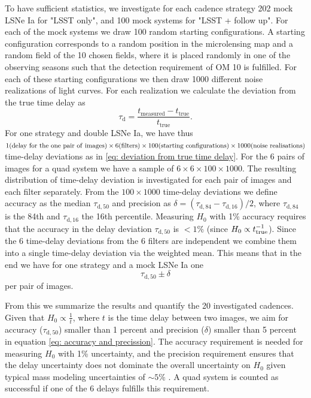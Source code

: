 To have sufficient statistics, we investigate for each cadence
strategy 202 mock LSNe Ia for "LSST only", and 100 mock systems for "LSST + follow up". For each of the mock systems we draw 100 random starting
configurations. A starting configuration corresponds to a random
position in the microlensing map and a random field of the 10 chosen fields, where it is placed randomly in one of the
observing seasons such that the detection requirement of OM 10 is
fulfilled. For each of these starting configurations we then draw 1000
different noise realizations of light curves. For each realization we calculate the deviation from the true time delay as
%
\begin{equation}
\tau_\mathrm{d} = \frac{t_\mathrm{measured} - t_\mathrm{true}}{t_\mathrm{true}}.
\label{eq: deviation from true time delay}
\end{equation}
For one strategy and double LSNe Ia, we have thus $1 {\rm (delay\ for\ the\
one\ pair\ of\ images)} \times 6 {\rm (filters)} \times 100 {\rm
(starting\ configurations)} \times 1000 {\rm (noise\ realisations)}$
time-delay deviations as in \eqref{eq: deviation from true time delay}.
For the 6 pairs of images for a quad system we have a sample of $6
\times 6 \times 100 \times 1000$. The resulting distribution of
time-delay deviation is investigated for each pair of images and each
filter separately. From the $100 \times 1000$ time-delay deviations we
define accuracy as the median $\tau_\mathrm{d,50}$ and precision as
$\delta = (\tau_\mathrm{d,84}-\tau_\mathrm{d,16})/2$, where
$\tau_\mathrm{d,84}$ is the 84th and $\tau_\mathrm{d,16}$ the 16th
percentile. Measuring $H_0$ with 1\% accuracy requires that the accuracy
in the delay deviation $\tau_\mathrm{d,50}$ is $<1\%$ (since $H_0 \propto
t_{\rm true}^{-1}$). Since the 6 time-delay deviations from the 6 filters are independent we combine them into a single time-delay deviation via the weighted mean. This means that in the end we have for one strategy and a mock LSNe Ia one 
\begin{equation}
\tau_\mathrm{d,50} \pm \delta
\label{eq: accuracy and precission}
\end{equation}
per pair of images.

From this we summarize the results and quantify the 20 investigated cadences. Given that $H_0 \propto \frac{1}{t}$, where $t$
is the time delay between two images, we aim for accuracy
($\tau_\mathrm{d,50}$) smaller than 1 percent and precision ($\delta$)
smaller than 5 percent in equation \ref{eq: accuracy and precission}. The accuracy
requirement is needed for measuring $H_0$ with 1\% uncertainty, and
the precision requirement ensures that the delay uncertainty does not
dominate the overall uncertainty on $H_0$ given typical mass modeling
uncertainties of $\sim 5\%$ \citep[e.g.,][]{Suyu2018}.  A quad system is counted as successful if one of the 6 delays fulfills this requirement. 

